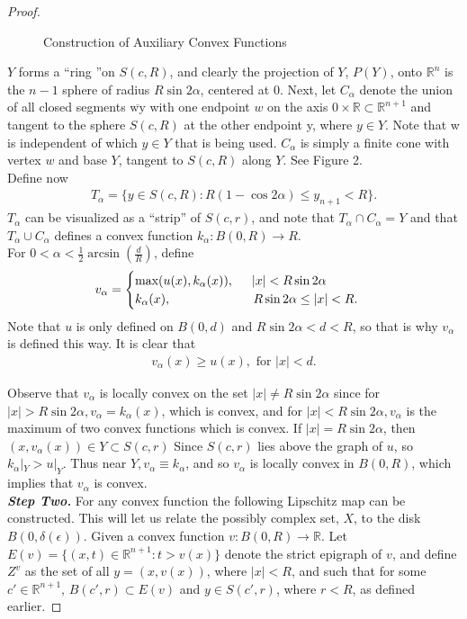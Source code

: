 \documentclass[10pt]{article}
\begin{document}
\begin{proof}
\begin{figure}[!h]
\caption{Construction of Auxiliary Convex Functions}
\end{figure}
$Y$ forms a \textquotedblleft ring \textquotedblright on $S(c,R)$, and clearly the projection of $Y$, $P(Y)$, onto $\mathbb{R}^{n}$ is the $n-1$ sphere of radius $R\sin 2\alpha$, centered at 0. Next, let $C_{\alpha}$ denote the union of all closed segments $\overline{\text{wy}}$ with one endpoint $w$ on the axis $0\times \mathbb{R}\subset \mathbb{R}^{n+1}$ and tangent to the sphere $S(c,R)$ at the other endpoint y, where $y\in Y$. Note that w is independent of which $y\in Y$ that is being used. $C_{\alpha}$ is simply a finite cone with vertex $w$ and base $Y$, tangent to $S(c,R)$ along $Y$. See Figure 2.\\
Define now 
\begin{align}
T_{\alpha}= \{y\in S(c,R): R(1-\cos 2\alpha)\leq y_{n+1}< R\}.
\end{align}
$T_{\alpha}$ can be visualized as a \textquotedblleft strip\textquotedblright \hspace{.25mm} of $S(c,r)$, and note that $T_{\alpha}\cap C_{\alpha}=Y$ and that $T_{\alpha}\cup C_{\alpha}$ defines a convex function $k_{\alpha}:B(0,R)\rightarrow R$.\\
For $0<\alpha<\frac{1}{2}\arcsin (\frac{d}{R})$, define
\begin{align*}
v_{\alpha}=
\begin{cases}
\text{max}(u(x),k_{\alpha}(x)),\hspace{5mm} |x|<R\sin 2\alpha\\
k_{\alpha}(x), \hspace{23mm} R\sin 2\alpha \leq |x|< R.
\end{cases}
\end{align*}
Note that $u$ is only defined on $B(0,d)$ and $R\sin 2\alpha <d<R$, so that is why $v_{\alpha}$ is defined this way. 
It is clear that
\begin{align}
v_{\alpha}(x)\geq u(x), \text{ for } |x|<d.
\end{align}

Observe that $v_{\alpha}$ is locally convex on the set $|x|\neq R\sin 2\alpha$ since for $|x|> R\sin 2\alpha,  v_{\alpha}=k_{\alpha}(x)$, which is convex, and for $|x|< R\sin 2\alpha, v_{\alpha}$ is the maximum of two convex functions which is convex. If $|x|=R\sin 2\alpha$, then $(x,v_{\alpha}(x))\in Y\subset S(c,r)$ Since $S(c,r)$ lies above the graph of $u$, so $k_{\alpha}|_{Y} > u|_{Y}$. Thus near $Y, v_{\alpha}\equiv k_{\alpha}$, and so $v_{\alpha}$ is locally convex in $B(0,R)$, which implies that $v_{\alpha}$ is convex.\\
\textbf{\textit{Step Two.}} For any convex function the following Lipschitz map can be constructed. This will let us relate the possibly complex set, $X$, to the disk $B(0,\delta(\epsilon))$. Given a convex function $v:B(0,R)\rightarrow \mathbb{R}$. Let $E(v)=\{(x,t)\in \mathbb{R}^{n+1}: t>v(x) \}$ denote the strict epigraph of $v$, and define $Z^{v}$ as the set of all $y=(x,v(x))$, where $|x|< R$, and such that for some $c'\in \mathbb{R}^{n+1}$, $B(c',r)\subset E(v)$ and $y\in S(c',r)$, where $r<R$, as defined earlier.


\end{proof}
\end{document}
